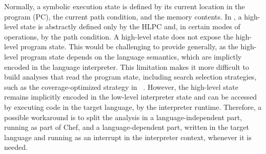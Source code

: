 

Normally, a symbolic execution state is defined by its current location in the program (PC), the current path condition, and the memory contents.
%
In \chef, a high-level state is abstractly defined only by the HLPC and, in certain modes of operations, by the path condition.
%
A \chef high-level state does not expose the high-level program state.  This would be challenging to provide generally, as the high-level program state depends on the language semantics, which are implictly encoded in the language interpreter.
%
This limitation makes it more difficult to build analyses that read the program state, including search selection strategies, such as the coverage-optimized strategy in \klee~\cite{klee}.
%
However, the high-level state remains implicitly encoded in the low-level interpreter state and can be accessed by executing code in the target language, by the interpreter runtime.  Therefore, a possible workaround is to split the analysis in a language-independent part, running as part of Chef, and a language-dependent part, written in the target language and running as an interrupt in the interpreter context, whenever it is needed.




